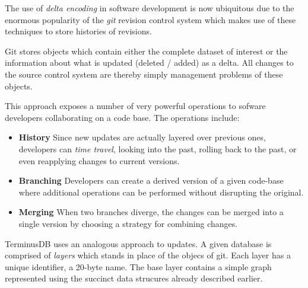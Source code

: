 \documentclass[10pt, a4paper, twocolumn]{article} %
\begin{document}
The use of {\em delta encoding} in software development is now
ubiquitous due to the enormous popularity of the {\em git} revision
control system which makes use of these techniques to store histories
of revisions.

Git stores objects which contain either the complete dataset of
interest or the information about what is updated (deleted / added) as
a delta. All changes to the source control system are thereby simply
management problems of these objects.

This approach exposes a number of very powerful operations to sofware
developers collaborating on a code base. The operations include:

\begin{itemize}
\item {\bf History} Since new updates are actually layered over previous
  ones, developers can {\em time travel}, looking into the past,
  rolling back to the past, or even reapplying changes to current
  versions.
\item {\bf Branching} Developers can create a derived version of a given
  code-base where additional operations can be performed without
  disrupting the original.
\item {\bf Merging} When two branches diverge, the changes can be merged
  into a single version by choosing a strategy for combining changes.
\end{itemize}

TerminusDB uses an analogous approach to updates. A given database is
comprised of {\em layers} which stands in place of the objecs of
git. Each layer has a unique identifier, a 20-byte name. The base
layer contains a simple graph represented using the succinct data
strucures already described earlier.
\end{document}
